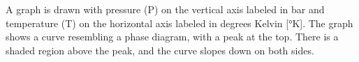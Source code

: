 A graph is drawn with pressure (P) on the vertical axis labeled in bar and temperature (T) on the horizontal axis labeled in degrees Kelvin [°K]. The graph shows a curve resembling a phase diagram, with a peak at the top. There is a shaded region above the peak, and the curve slopes down on both sides.